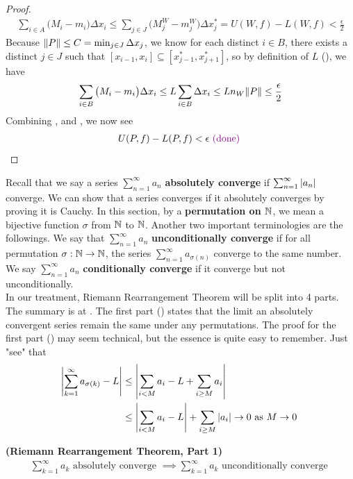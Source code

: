 \documentclass{report}
\begin{document}
\begin{proof}
\begin{align}
  \label{e3}
\sum_{i \in A} \big( M_i-m_i\big) \Delta x_i \leq \sum_{j \in J} \big(M_j^W-m_j^W \big) \Delta x_j^* = U(W,f)-L(W,f)< \frac{\epsilon}{2}
\end{align}
Because $\| P \|\leq C=\min_{j \in J} \Delta x_j$, we know for each distinct $i \in B$, there exists a distinct $ j \in J$ such that $[x_{i-1},x_i]\subseteq [x_{j-1}^*, x_{j+1}^*]$, so by definition of $L$  (), we have 
\begin{align}
\label{e4}
\sum_{i \in B} \big(M_i-m_i \big) \Delta x_i \leq L\sum_{i \in B} \Delta x_i \leq L n_W \| P \| \leq \frac{\epsilon }{2} 
\end{align}
Combining  ,  and , we now see 
\begin{align*}
U(P,f)-L(P,f) <\epsilon \textcolor{violet}{\text{ (done) }}
\end{align*}
\end{proof}
\begin{mdframed}
Recall that we say a series $\sum_{n=1}^\infty a_n$ \textbf{absolutely converge} if $\sum_{n=1}^\infty \left|a_n\right| $ converge. We can show that a series converges if it absolutely converges by proving it is Cauchy. In this section, by a \textbf{permutation on $\mathbb{N}$}, we mean a bijective function $\sigma$ from $\mathbb{N}$ to $\mathbb{N}$. Another two important terminologies are the followings. We say that $\sum_{n=1}^\infty a_n$ \textbf{unconditionally converge} if for all permutation $\sigma:\mathbb{N}\rightarrow \mathbb{N}$, the series $\sum_{n=1}^\infty a_{\sigma(n)}$ converge to the same number. We say $\sum_{n=1}^\infty a_n$ \textbf{conditionally converge} if it converge but not unconditionally.\\

In our treatment, Riemann Rearrangement Theorem will be split into 4 parts. The summary is at . The first part () states that the limit an absolutely convergent series remain the same under any permutations. The proof for the first part () may seem technical, but the essence is quite easy to remember. Just "see" that 
\begin{align*}
  \left|\sum_{k=1}^\infty a_{\sigma (k)}-L\right|&\leq \left|\sum_{i<M}a_i -L + \sum_{i\geq M}a_i\right|\\
&\leq \left|\sum_{i<M}a_i-L \right|+\sum_{i\geq M} \left|a_i\right| \to 0 \text{ as $M\to 0$ }
\end{align*}
\end{mdframed}
\begin{theorem}
\label{2}
\textbf{(Riemann Rearrangement Theorem, Part 1)}  
\begin{align*}
\sum_{k=1}^\infty a_k \text{ absolutely converge }\implies  \sum_{k=1}^\infty a_k \text{ unconditionally converge }
\end{align*}
\end{theorem}
\end{document}
